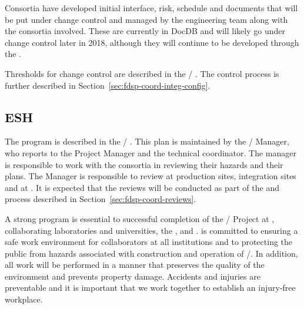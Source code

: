 Consortia have developed initial interface, risk, schedule and 
documents that will be put under change control and managed by the 
engineering team along with the consortia involved. These
are currently in DocDB and will likely go under change control later
in 2018, although they will continue to be developed through the .

Thresholds for change control are described in the
/ . The control process is further
described in Section~\ref{sec:fdsp-coord-integ-config}.

\subsection{ESH}
\label{sec:fdsp-coord-esh}

The   program is described in the
/ . This plan is maintained by
the /  Manager, who reports to the
 Project Manager and the technical coordinator. The
 manager is responsible to work with the consortia in
reviewing their hazards and their  plans.  The 
Manager is responsible to review  at production sites,
integration sites and at \surf. It is expected that the 
reviews will be conducted as part of the  and 
process described in Section~\ref{sec:fdsp-coord-reviews}.

A strong  program is essential to successful completion of
the / Project at \fnal, collaborating laboratories and
universities, the , and \surf.  is committed to ensuring
a safe work environment for %
collaborators at
all institutions and to protecting the public from hazards associated
with construction and operation of /. In
addition, all work will be performed in a manner that preserves the
quality of the environment and prevents property damage. Accidents and
injuries are preventable and it is important that we work together to
establish an injury-free workplace.

